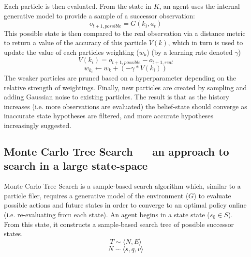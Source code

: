 \newline \newline
Each particle is then evaluated. From the state in $K$, an agent uses the internal generative model to provide a sample of a successor observation: 
\begin{equation}
    o_{t+1, possible} = G(k_i, a_t)
\end{equation}
This possible state is then compared to the real observation via a distance metric to return a value of the accuracy of this particle $V(k)$, which in turn is used to update the value of each particles weighting ($w_k$) (by a learning rate denoted $\gamma$) 
\begin{equation}
    V(k_i) = o_{t+1, possible} - o_{t+1, real}
\end{equation}
\begin{equation}
    w_{k_i} \leftarrow w_k + (- \gamma * V(k_i))
\end{equation}
The weaker particles are pruned based on a hyperparameter depending on the relative strength of weightings. Finally, new particles are created by sampling and adding Gaussian noise to existing particles. 
\newline \newline
The result is that as the history increases (i.e. more observations are evaluated) the belief-state should converge as inaccurate state hypotheses are filtered, and more accurate hypotheses increasingly suggested. 

\subsection{Monte Carlo Tree Search --- an approach to search in a large state-space}\label{MCTSDesc}
Monte Carlo Tree Search is a sample-based search algorithm which, similar to a particle filer, requires a generative model of the environment ($G$) to evaluate possible actions and future states in order to converge to an optimal policy online (i.e. re-evaluating from each state). 
\newline \newline
An agent begins in a state state ($s_0 \in S$). From this state, it constructs a sample-based search tree of possible successor states.
\begin{equation}
    T \sim \langle N, E \rangle
\end{equation} 
\begin{equation}
    N \sim \langle s, q, v \rangle 
\end{equation}

